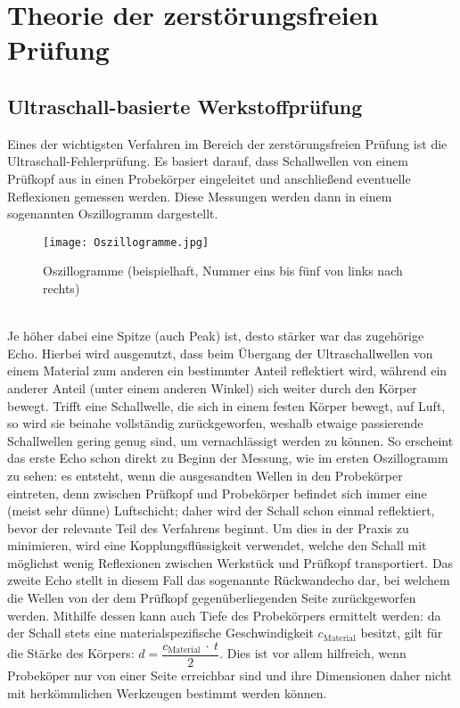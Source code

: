 \documentclass[a4paper, 10pt]{scrartcl}
\begin{document}
\section{Theorie der zerstörungsfreien Prüfung}
\subsection{Ultraschall-basierte Werkstoffprüfung}
Eines der wichtigsten Verfahren im Bereich der zerstörungsfreien Prüfung ist die Ultraschall-Fehlerprüfung. Es basiert darauf, dass Schallwellen von einem Prüfkopf aus in einen Probekörper eingeleitet und anschließend eventuelle Reflexionen gemessen werden. Diese Messungen werden dann in einem sogenannten Oszillogramm dargestellt.
\begin{figure}[h]\begin{center}
\label{oszillogramme}
\texttt{[image: Oszillogramme.jpg]}
\caption{Oszillogramme (beispielhaft, Nummer eins bis fünf von links nach rechts)}
\end{center}\end{figure}\\
Je höher dabei eine Spitze (auch Peak) ist, desto stärker war das zugehörige Echo. Hierbei wird ausgenutzt, dass beim Übergang der Ultraschallwellen von einem Material zum anderen ein bestimmter Anteil reflektiert wird, während ein anderer Anteil (unter einem anderen Winkel) sich weiter durch den Körper bewegt. Trifft eine Schallwelle, die sich in einem festen Körper bewegt, auf Luft, so wird sie beinahe vollständig zurückgeworfen, weshalb etwaige passierende Schallwellen gering genug sind, um vernachlässigt werden zu können. So erscheint das erste Echo schon direkt zu Beginn der Messung, wie im ersten Oszillogramm zu sehen: es entsteht, wenn die ausgesandten Wellen in den Probekörper eintreten, denn zwischen Prüfkopf und Probekörper befindet sich immer eine (meist sehr dünne) Luftschicht; daher wird der Schall schon einmal reflektiert, bevor der relevante Teil des Verfahrens beginnt. Um dies in der Praxis zu minimieren, wird eine Kopplungsflüssigkeit verwendet, welche den Schall mit möglichst wenig Reflexionen zwischen Werkstück und Prüfkopf transportiert. Das zweite Echo stellt in diesem Fall das sogenannte Rückwandecho dar, bei welchem die Wellen von der dem Prüfkopf gegenüberliegenden Seite zurückgeworfen werden. Mithilfe dessen kann auch Tiefe des Probekörpers ermittelt werden: da der Schall stets eine materialspezifische Geschwindigkeit $c_\mathrm{Material}$ \cite{schallgeschwindigkeiten} besitzt, gilt für die Stärke des Körpers: $d = \dfrac{c_\mathrm{Material}~\cdot~t}{2}$. Dies ist vor allem hilfreich, wenn Probeköper nur von einer Seite erreichbar sind und ihre Dimensionen daher nicht mit herkömmlichen Werkzeugen bestimmt werden können.\\
\end{document}
